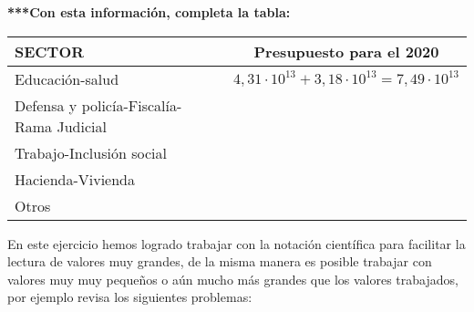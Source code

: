 \documentclass[12pt,a4paper]{article}
\begin{document}
\vspace{0.5cm}

\textbf{***Con esta información, completa la tabla:}

\vspace{0.5cm}

\begin{center}
\begin{tabular}{|l|c|}
\hline
\cellcolor{fondoazul}\textbf{SECTOR} & \textbf{Presupuesto para el 2020} \\
\hline
Educación-salud & $4,31 \cdot 10^{13} + 3,18 \cdot 10^{13} = 7,49 \cdot 10^{13}$ \\
\hline
Defensa y policía-Fiscalía-Rama Judicial & \\
\hline
Trabajo-Inclusión social & \\
\hline
Hacienda-Vivienda & \\
\hline
Otros & \\
\hline
\end{tabular}
\end{center}


En este ejercicio hemos logrado trabajar con la notación científica para facilitar la lectura de valores muy grandes, de la misma manera es posible trabajar con valores muy muy pequeños o aún mucho más grandes que los valores trabajados, por ejemplo revisa los siguientes problemas:

\vspace{0.5cm}
\end{document}
